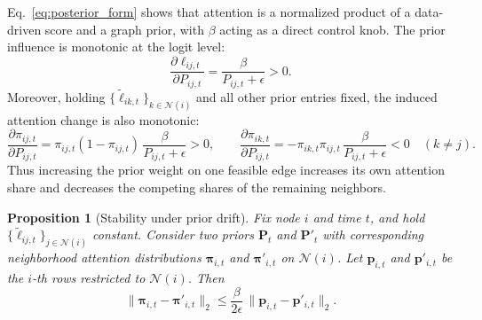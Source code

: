 \documentclass[preprint,12pt]{elsarticle}
\newtheorem{proposition}{Proposition}
\begin{document}
Eq.~\eqref{eq:posterior_form} shows that attention is a normalized product of a data-driven score and a graph prior,
with $\beta$ acting as a direct control knob.
The prior influence is monotonic at the logit level:
\begin{equation}
\frac{\partial \ell_{ij,t}}{\partial P_{ij,t}}
=
\frac{\beta}{P_{ij,t}+\epsilon}
>
0.
\label{eq:monotonic}
\end{equation}
Moreover, holding $\{\tilde{\ell}_{ik,t}\}_{k\in\mathcal{N}(i)}$ and all other prior entries fixed, the induced attention change is also monotonic:
\[
\frac{\partial \pi_{ij,t}}{\partial P_{ij,t}}
=
\pi_{ij,t}(1-\pi_{ij,t})\,\frac{\beta}{P_{ij,t}+\epsilon}
>
0,
\qquad
\frac{\partial \pi_{ik,t}}{\partial P_{ij,t}}
=
-\pi_{ik,t}\pi_{ij,t}\,\frac{\beta}{P_{ij,t}+\epsilon}
<
0
\quad (k\neq j).
\]
Thus increasing the prior weight on one feasible edge increases its own attention share and decreases the competing shares of the remaining neighbors.

\begin{proposition}[Stability under prior drift]
\label{prop:stability}
Fix node $i$ and time $t$, and hold $\{\tilde{\ell}_{ij,t}\}_{j\in\mathcal{N}(i)}$ constant.
Consider two priors $\mathbf{P}_t$ and $\mathbf{P}'_t$ with corresponding neighborhood attention distributions
$\boldsymbol{\pi}_{i,t}$ and $\boldsymbol{\pi}'_{i,t}$ on $\mathcal{N}(i)$.
Let $\mathbf{p}_{i,t}$ and $\mathbf{p}'_{i,t}$ be the $i$-th rows restricted to $\mathcal{N}(i)$.
Then
\begin{equation}
\|\boldsymbol{\pi}_{i,t}-\boldsymbol{\pi}'_{i,t}\|_2
\le
\frac{\beta}{2\epsilon}\,\|\mathbf{p}_{i,t}-\mathbf{p}'_{i,t}\|_2.
\label{eq:stability_bound}
\end{equation}
\end{proposition}
\end{document}
